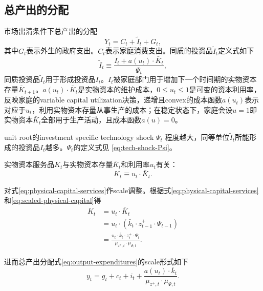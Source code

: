 \subsection{总产出的分配}
\label{sec:total-output-allocation}
市场出清条件下总产出的分配
\begin{equation}
  \label{eq:output-expenditures}
  Y_t = C_t + \tilde{I}_t + G_t,
\end{equation}
其中$G_t$表示外生的政府支出。$C_t$表示家庭消费支出。同质的投资品$\tilde{I}_t$定义式如下
\begin{equation}
  \label{eq:investment-goods-homo}
  \tilde{I}_t \equiv \frac{I_t + a(u_t) \cdot \bar{K}_t}{\Psi_t},
\end{equation}
同质投资品$\tilde{I}_t$用于形成投资品$I_t$。$I_t$被家庭部门用于增加下一个时间期的实物资本存量$\bar{K}_{t+1}$。$a(u_t) \cdot \bar{K}_t$是实物资本的维护成本，$0 \le u_t \le 1$是可变的资本利用率，反映家庭的variable capital utilization决策，递增且convex的成本函数$a(u_t)$表示对应于$u_t$，利用实物资本存量从事生产的成本；在稳定状态下，家庭会设$u=1$即实物资本$\bar{K}_t$全部用于生产活动，且成本函数$a(u) = 0$。

unit root的investment specific technology shock $\Psi_t$ 程度越大，同等单位$\tilde{I}_t$所能形成的投资品$I_t$越多。$\Psi_t$的定义式见  \eqref{eq:tech-shock-Psi}。

实物资本服务品$K_t$与实物资本存量$\bar{K}_t$和利用率$u_t$有关：
\begin{equation}
  \label{eq:physical-capital-services}
  K_t \equiv u_t \cdot \bar{K}_t.
\end{equation}

对式\eqref{eq:physical-capital-services}作scale调整。根据式\eqref{eq:physical-capital-services}和\eqref{eq:scaled-physical-capital}得
\begin{equation}
\label{eq:K-bar-K-ut-bar-k}
\begin{split}
K_t &= u_t \cdot \bar{K}_t \\
&=u_t \cdot \left(\bar{k}_t \cdot z^+_{t-1} \cdot \Psi_{t-1}\right) \\
&= \frac{u_t \cdot \bar{k}_t \cdot z^+_t \cdot \Psi_t}{\mu_{z^+,t} \cdot \mu_{\Psi,t}}.
\end{split}
\end{equation}

进而总产出分配式\eqref{eq:output-expenditures}的scale形式如下
\begin{equation}
\label{eq:output-expenditures-scaled}
y_t = g_t + c_t + i_t + \frac{
  a(u_t) \cdot \bar{k}_t
  }{\mu_{z^+,t} \cdot \mu_{\Psi,t}}.
\end{equation}

